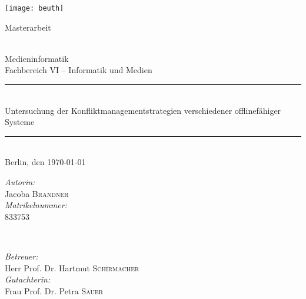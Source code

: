 \begin{titlepage}


	\center %


	\begin{center}
		\texttt{[image: beuth]}  \\[2cm]
			\end{center}

			\begin{Large}
				Masterarbeit
			\end{Large}\\[0.4cm]
			\LARGE{Medieninformatik}\\
			\large{Fachbereich VI -- Informatik und Medien}\\[0.5cm]


			\rule{\textwidth}{0.4pt}\\[1cm] %
			{\LARGE Untersuchung der Konfliktmanagementstrategien verschiedener offlinefähiger Systeme}\\[\baselineskip]

			\rule{\textwidth}{0.4pt}\\[1cm]%

			{\Large Berlin, den \today{}} %
			\vfill


			\begin{minipage}{0.49\textwidth}
				\begin{flushleft} \large
					\emph{Autorin:}\\
					Jacoba \textsc{Brandner} \\
					\emph{Matrikelnummer:}\\
					833753
				\end{flushleft}
			\end{minipage}
			~
			\begin{minipage}{0.49\textwidth}
				\begin{flushright} \large
					\emph{Betreuer:} \\
					Herr Prof. Dr. Hartmut \textsc{Schirmacher} \\
					\emph{Gutachterin:} \\
					Frau Prof. Dr. Petra \textsc{Sauer} \\
				\end{flushright}
			\end{minipage}


			\vfill %
			\end{titlepage}
